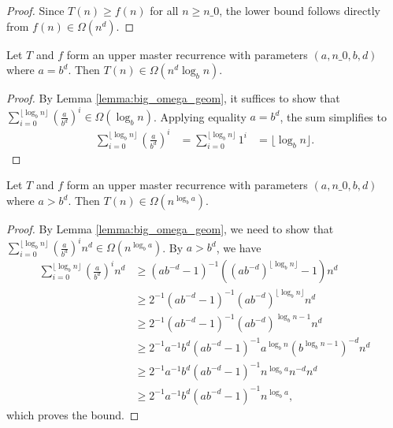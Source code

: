\begin{proof}
    \leanok
    Since $T(n) \geq f(n)$ for all $n \ge n\_0$, the lower bound follows 
    directly from $f(n) \in \Omega(n^d)$.
\end{proof}

\begin{theorem}
    \label{thm:upper_master_rec_big_omega_of_eq}
    \leanok
    Let $T$ and $f$ form an upper master recurrence with parameters 
    $(a, n\_0, b, d)$ where $a = b^d$. Then $T(n) \in \Omega(n^d \log_b{n})$.
\end{theorem}

\begin{proof}
    \leanok
    By Lemma \ref{lemma:big_omega_geom}, it suffices to show that
    $\sum_{i=0}^{\lfloor \log_b{n} \rfloor} (\frac{a}{b^d})^i \in 
    \Omega(\log_b{n})$. Applying equality $a = b^d$, the sum simplifies to
    \begin{align*}
        \sum_{i=0}^{\lfloor \log_b{n} \rfloor} (\frac{a}{b^d})^i &= 
            \sum_{i=0}^{\lfloor \log_b{n} \rfloor} 1^i &=
            \lfloor \log_b{n} \rfloor.
    \end{align*}
\end{proof}

\begin{theorem}
    \label{thm:upper_master_rec_big_omega_of_gt}
    \leanok
    Let $T$ and $f$ form an upper master recurrence with parameters 
    $(a, n\_0, b, d)$ where $a > b^d$. Then $T(n) \in \Omega(n^{\log_b{a}})$.
\end{theorem}

\begin{proof}
    \leanok
    By Lemma \ref{lemma:big_omega_geom}, we need to show that 
    $\sum_{i=0}^{\lfloor \log_b{n} \rfloor} (\frac{a}{b^d})^i n^d
    \in \Omega(n^{\log_b{a}})$. By $a > b^d$, we have 
    \begin{align*}
        \sum_{i=0}^{\lfloor \log_b{n} \rfloor} (\frac{a}{b^d})^i n^d 
        &\geq (a b^{-d} - 1)^{-1}
            ((a b^{-d})^{\lfloor \log_b{n} \rfloor} - 1) n^d \\
        &\geq 2^{-1} (a b^{-d} - 1)^{-1}
            (a b^{-d})^{\lfloor \log_b{n} \rfloor} n^d \\
        &\geq 2^{-1} (a b^{-d} - 1)^{-1} (a b^{-d})^{\log_b{n} - 1} n^d \\
        &\geq 2^{-1} a^{-1} b^d (a b^{-d} - 1)^{-1} a^{\log_b{n}} 
            (b^{\log_b{n} - 1})^{-d} n^d \\
        &\geq 2^{-1} a^{-1} b^d (a b^{-d} - 1)^{-1} n^{\log_b{a}} n^{-d} n^d \\
        &\geq 2^{-1} a^{-1} b^d (a b^{-d} - 1)^{-1} n^{\log_b{a}},
    \end{align*}
    which proves the bound.
\end{proof}


